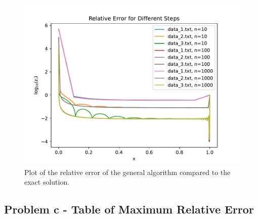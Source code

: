 \documentclass[english,notitlepage]{revtex4-1}  %
\begin{document}
\begin{figure}[h!]
    \centering %
    \includegraphics[scale=0.70]{problem8/relative_error_plot.pdf} %
    \caption{Plot of the relative error of the general algorithm compared to the exact solution.} %
    \label{fig:relative_error} %
\end{figure}

\subsection*{Problem c - Table of Maximum Relative Error}
\end{document}
